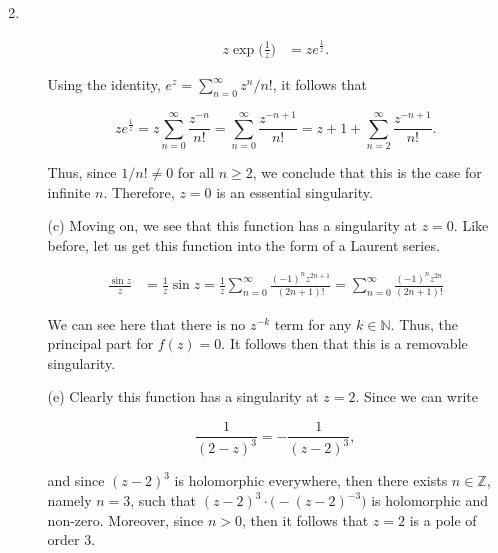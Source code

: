 \documentclass{article}
\makeatletter
\theoremstyle{definition}
\theoremstyle{remark}
\newenvironment{solution}[1][\bf{\textit{Solution}}]{\par
  
  \normalfont \topsep6\p@\@plus6\p@\relax
  \list{}{\leftmargin=0mm
          \rightmargin=0mm
          \settowidth{\itemindent}{\itshape#1}%
          \labelwidth=\itemindent
          \parsep=0pt \listparindent=\parindent 
  }
  \item[\hskip\labelsep
        \itshape
    #1\@addpunct{.}]\ignorespaces
}{%
  \popQED\endlist\@endpefalse
}
\makeatother
\begin{document}
\begin{enumerate}[leftmargin=*]
\begin{solution}
\begin{enumerate}[label=(\alph*)]
            \begin{equation*}
                \begin{split}
                    z\exp{\bigg(\frac{1}{z}\bigg)}&=ze^{\frac{1}{z}}.
                \end{split}
            \end{equation*}
            
            \noindent Using the identity, $e^z=\sum_{n=0}^{\infty}z^n/n!$, it follows that 
            
            \begin{equation*}
                ze^{\frac{1}{z}}=z\sum_{n=0}^{\infty}\frac{z^{-n}}{n!}=\sum_{n=0}^{\infty}\frac{z^{-n+1}}{n!}=z+1+\sum_{n=2}^{\infty}\frac{z^{-n+1}}{n!}.
            \end{equation*}
            
            \noindent Thus, since $1/n!\neq 0$ for all $n\geq 2$, we conclude that this is the case for infinite $n$. Therefore, $z=0$ is an essential singularity.
            
            \vspace{2mm}
            
            \item[(c)] Moving on, we see that this function has a singularity at $z=0$. Like before, let us get this function into the form of a Laurent series. 
            
            \begin{equation*}
                \begin{split}
                    \frac{\sin{z}}{z}&= \frac{1}{z}\sin{z}=\frac{1}{z}\sum_{n=0}^{\infty}\frac{(-1)^nz^{2n+1}}{(2n+1)!}=\sum_{n=0}^{\infty}\frac{(-1)^nz^{2n}}{(2n+1)!}
                \end{split}
            \end{equation*}
            
            \noindent We can see here that there is no $z^{-k}$ term for any $k\in\mathbb{N}$. Thus, the principal part for $f(z)=0$. It follows then that this is a removable singularity.
            
            \newpage
            
            \item[(e)] Clearly this function has a singularity at $z=2$. Since we can write
            
            \begin{equation*}
                \frac{1}{(2-z)^3}=-\frac{1}{(z-2)^3},
            \end{equation*}
            
            and since $(z-2)^3$ is holomorphic everywhere, then there exists $n\in\mathbb{Z}$, namely $n=3$, such that $(z-2)^3\cdot\big(-(z-2)^{-3}\big)$ is holomorphic and non-zero. Moreover, since $n>0$, then it follows that $z=2$ is a pole of order $3$.
        \end{enumerate}
    \end{solution}
    
\end{enumerate}
\end{document}
